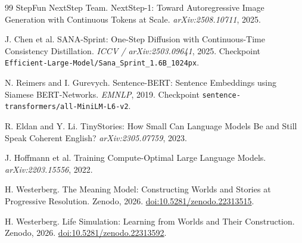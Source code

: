 \documentclass[11pt,a4paper]{article}
\begin{document}
\begin{thebibliography}{99}
 StepFun NextStep Team. NextStep-1: Toward Autoregressive Image Generation with Continuous Tokens at Scale. \emph{arXiv:2508.10711}, 2025.

 J. Chen et al. SANA-Sprint: One-Step Diffusion with Continuous-Time Consistency Distillation. \emph{ICCV / arXiv:2503.09641}, 2025. Checkpoint \texttt{Efficient-Large-Model/Sana\_Sprint\_1.6B\_1024px}.

 N. Reimers and I. Gurevych. Sentence-BERT: Sentence Embeddings using Siamese BERT-Networks. \emph{EMNLP}, 2019. Checkpoint \texttt{sentence-transformers/all-MiniLM-L6-v2}.

 R. Eldan and Y. Li. TinyStories: How Small Can Language Models Be and Still Speak Coherent English? \emph{arXiv:2305.07759}, 2023.

 J. Hoffmann et al. Training Compute-Optimal Large Language Models. \emph{arXiv:2203.15556}, 2022.

 H. Westerberg. The Meaning Model: Constructing Worlds and Stories at Progressive Resolution. Zenodo, 2026. \href{https://doi.org/10.5281/zenodo.22313515}{doi:10.5281/zenodo.22313515}.

 H. Westerberg. Life Simulation: Learning from Worlds and Their Construction. Zenodo, 2026. \href{https://doi.org/10.5281/zenodo.22313592}{doi:10.5281/zenodo.22313592}.

\end{thebibliography}
\end{document}
